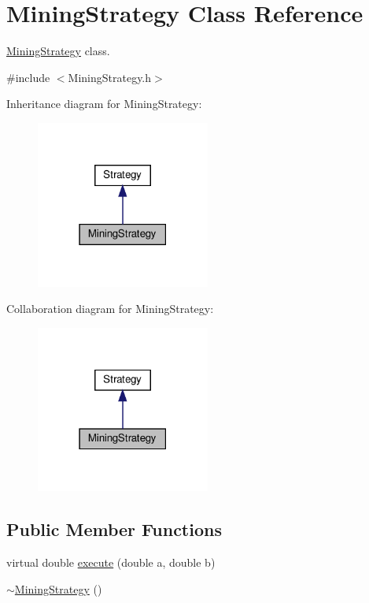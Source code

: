 \hypertarget{classMiningStrategy}{}\section{Mining\+Strategy Class Reference}
\label{classMiningStrategy}


\hyperlink{classMiningStrategy}{Mining\+Strategy} class.  




{\ttfamily \#include $<$Mining\+Strategy.\+h$>$}



Inheritance diagram for Mining\+Strategy\+:
\nopagebreak
\begin{figure}[H]
\begin{center}
\leavevmode
\includegraphics[width=162pt]{classMiningStrategy__inherit__graph}
\end{center}
\end{figure}


Collaboration diagram for Mining\+Strategy\+:
\nopagebreak
\begin{figure}[H]
\begin{center}
\leavevmode
\includegraphics[width=162pt]{classMiningStrategy__coll__graph}
\end{center}
\end{figure}
\subsection*{Public Member Functions}
\begin{DoxyCompactItemize}
\item 
virtual double \hyperlink{classMiningStrategy_ace2ad68881b60573b90921a8087aee75}{execute} (double a, double b)
\item 
\hyperlink{classMiningStrategy_a9d57c0f71bd7bcc4c13360b9406ceb8c}{$\sim$\+Mining\+Strategy} ()
\end{DoxyCompactItemize}


